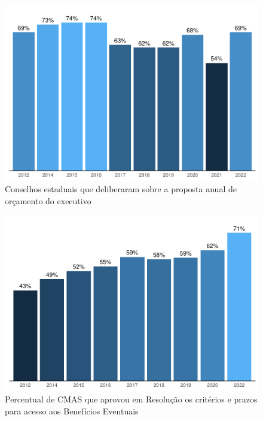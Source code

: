 \documentclass[
  brazilian]{report}
\begin{document}
\begin{figure}
\includegraphics{Censo-SUAS-2022_files/figure-latex/ceas-ppa-1} \caption[Conselhos estaduais que deliberaram sobre a proposta anual de orçamento do executivo]{Conselhos estaduais que deliberaram sobre a proposta anual de orçamento do executivo}\label{fig:ceas-ppa}
\end{figure}

\begin{figure}
\includegraphics{Censo-SUAS-2022_files/figure-latex/cmas-be-1} \caption[Percentual de CMAS que aprovou em Resolução os critérios e prazos para acesso aos Benefícios Eventuais]{Percentual de CMAS que aprovou em Resolução os critérios e prazos para acesso aos Benefícios Eventuais}\label{fig:cmas-be}
\end{figure}
\end{document}
